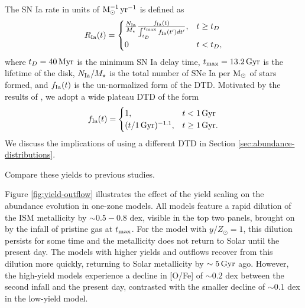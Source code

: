 \documentclass[twocolumn,twocolappendix,linenumbers]{aastex631}
\newcommand{\todo}[1]{{\color{red}#1}}
\begin{document}
The SN Ia rate in units of ${\rm M}_\odot^{-1}\,{\rm yr}^{-1}$ is defined as
\begin{equation}
    R_{\rm Ia}(t) = 
    \begin{cases}
        \frac{N_{\rm Ia}}{M_\star}
        \frac{f_{\rm Ia}(t)}{\int_{t_D}^{t_{\rm max}} f_{\rm Ia}(t') dt'}, & t \ge t_D \\
        0 & t < t_D,
    \end{cases}
    \label{eq:dtd-function}
\end{equation}
where $t_D=40\,{\rm Myr}$ is the minimum SN Ia delay time, $t_{\rm max}=13.2\,{\rm Gyr}$ is the lifetime of the disk, $N_{\rm Ia}/M_\star$ is the total number of SNe Ia per ${\rm M}_\odot$ of stars formed, and $f_{\rm Ia}(t)$ is the un-normalized form of the DTD. Motivated by the results of \citet{dubay_galactic_2024}, we adopt a wide plateau DTD of the form
\begin{equation}
    \label{eq:plateau-dtd}
    f_{\rm Ia}(t) =
    \begin{cases}
        1, & t < 1\,{\rm Gyr} \\
        (t/1\,{\rm Gyr})^{-1.1}, & t \ge 1\,{\rm Gyr}.
    \end{cases}
\end{equation}
We discuss the implications of using a different DTD in Section \ref{sec:abundance-distributions}.

\todo{Compare these yields to previous studies.}

Figure \ref{fig:yield-outflow} illustrates the effect of the yield scaling on the abundance evolution in one-zone models. All models feature a rapid dilution of the ISM metallicity by $\sim0.5-0.8$ dex, visible in the top two panels, brought on by the infall of pristine gas at $t_{\rm max}$. For the model with $y/Z_\odot=1$, this dilution persists for some time and the metallicity does not return to Solar until the present day. The models with higher yields and outflows recover from this dilution more quickly, returning to Solar metallicity by $\sim5\,{\rm Gyr}$ ago. However, the high-yield models experience a decline in [O/Fe] of $\sim0.2$ dex between the second infall and the present day, contrasted with the smaller decline of $\sim0.1$ dex in the low-yield model.
\end{document}

